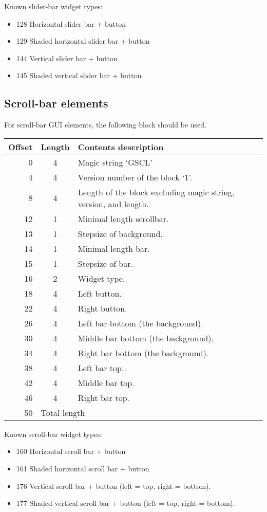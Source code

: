 \documentclass{article}
\begin{document}
Known slider-bar widget types:
\begin{itemize}
\item 128 Horizontal slider bar + button
\item 129 Shaded horizontal slider bar + button
\item 144 Vertical slider bar + button
\item 145 Shaded vertical slider bar + button
\end{itemize}


\subsection{Scroll-bar elements}
For scroll-bar GUI elements, the following block
should be used.
\begin{center}
\begin{tabular}{|r|c|l|} \hline
\textbf{Offset} & \textbf{Length} & \textbf{Contents description} \\ \hline
   0 &  4 & Magic string `GSCL' \\
   4 &  4 & Version number of the block `1'. \\
   8 &  4 & Length of the block excluding magic string, version, and length. \\
  12 &  1 & Minimal length scrollbar. \\
  13 &  1 & Stepsize of background. \\
  14 &  1 & Minimal length bar. \\
  15 &  1 & Stepsize of bar. \\
  16 &  2 & Widget type. \\
  18 &  4 & Left button. \\
  22 &  4 & Right button. \\
  26 &  4 & Left bar bottom (the background). \\
  30 &  4 & Middle bar bottom (the background). \\
  34 &  4 & Right bar bottom (the background). \\
  38 &  4 & Left bar top. \\
  42 &  4 & Middle bar top. \\
  46 &  4 & Right bar top. \\
  50 & \multicolumn{2}{l|}{Total length} \\ \hline
\end{tabular}
\end{center}

Known scroll-bar widget types:
\begin{itemize}
\item 160 Horizontal scroll bar + button
\item 161 Shaded horizontal scroll bar + button
\item 176 Vertical scroll bar + button (left = top, right = bottom).
\item 177 Shaded vertical scroll bar + button (left = top, right = bottom).
\end{itemize}
\end{document}
